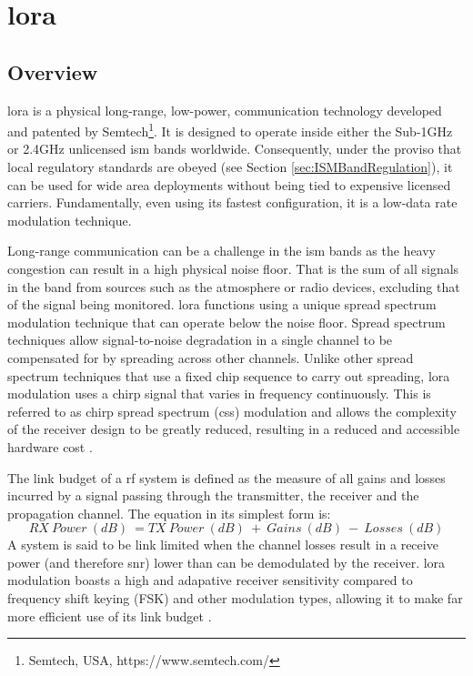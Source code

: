 \section{\ac{lora}}
\label{sec:lora}
\subsection{Overview}
\ac{lora} is a physical long-range, low-power, communication technology developed and patented by Semtech\footnote{Semtech, USA, https://www.semtech.com/}. It is designed to operate inside either the Sub-1GHz or 2.4GHz unlicensed \ac{ism} bands worldwide. Consequently, under the proviso that local regulatory standards are obeyed (see Section \ref{sec:ISMBandRegulation}), it can be used for wide area deployments without being tied to expensive licensed carriers. Fundamentally, even using its fastest configuration, it is a low-data rate modulation technique.

Long-range communication can be a challenge in the \ac{ism} bands as the heavy congestion can result in a high physical noise floor. That is the sum of all signals in the band from sources such as the atmosphere or radio devices, excluding that of the signal being monitored. \ac{lora} functions using a unique spread spectrum modulation technique that can operate below the noise floor. Spread spectrum techniques allow signal-to-noise degradation in a single channel to be compensated for by spreading across other channels. Unlike other spread spectrum techniques that use a fixed chip sequence to carry out spreading, \ac{lora} modulation uses a chirp signal that varies in frequency continuously. This is referred to as chirp spread spectrum (\ac{css}) modulation and allows the complexity of the receiver design to be greatly reduced, resulting in a reduced and accessible hardware cost \cite{3YP:LORA_MOD_BASICS}. 

The link budget of a \ac{rf} system is defined as the measure of all gains and losses incurred by a signal passing through the transmitter, the receiver and the propagation channel. The equation in its simplest form is:
\begin{equation}
\label{eq:link_budget}
RX\ Power\ (dB)\ = TX\ Power\ (dB)\ +\ Gains\ (dB)\ -\ Losses\ (dB)
\end{equation}
A system is said to be link limited when the channel losses result in a receive power (and therefore \ac{snr}) lower than can be demodulated by the receiver. \ac{lora} modulation boasts a high and adapative receiver sensitivity compared to frequency shift keying (FSK) and other modulation types, allowing it to make far more efficient use of its link budget \cite{3YP:LORA_MOD_BASICS}.


